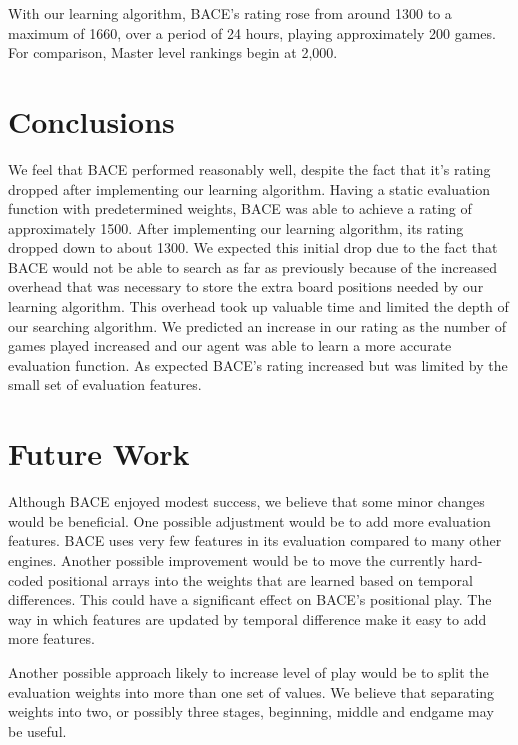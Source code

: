 \documentclass{article}
\begin{document}
With our learning algorithm, BACE's rating rose from around 1300 to a
maximum of 1660, over a period of 24 hours, playing approximately 200
games.  For comparison, Master level rankings begin at 2,000.  

% 

\section{Conclusions}

We feel that BACE performed reasonably well, despite the fact that
it's rating dropped after implementing our learning algorithm.  Having
a static evaluation function with predetermined weights, BACE was
able to achieve a rating of approximately 1500.  After implementing
our learning algorithm, its rating dropped down to about 1300.  We
expected this initial drop due to the fact that BACE would not be able
to search as far as previously because of the  increased overhead that
was necessary to store the extra board 
positions needed by our learning algorithm.  This overhead took up
valuable time and limited the depth of our searching algorithm.  We
predicted an increase in our 
rating as the number of games played increased and our agent was able
to learn a more accurate evaluation function.  As expected BACE's
rating increased but was limited by the small set of evaluation
features.

\section{Future Work}

Although BACE enjoyed modest success, we believe that some minor
changes would be beneficial.  One  
possible adjustment would be to add more evaluation features.  BACE
uses very few features in its evaluation compared to many other
engines.  Another possible improvement would be to move the currently
hard-coded positional arrays into the weights that are learned based
on temporal differences.  This could have a significant effect on
BACE's positional play.  The way in which features are updated by
temporal difference make it easy to add more features.

Another possible approach likely to increase level of play would be to
split the evaluation weights into more than one set of values.  We
believe that separating 
weights into two, or possibly three stages, beginning, middle and
endgame may be useful.
\end{document}
